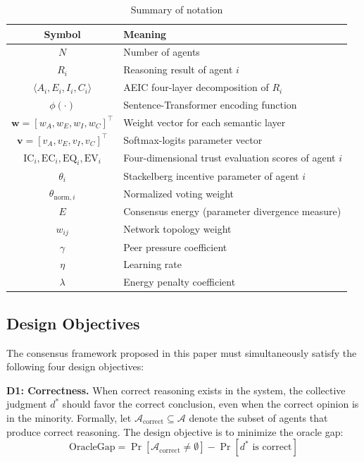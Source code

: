 \documentclass[12pt,a4paper]{article}
\begin{document}
\begin{table}[H]
\centering
\caption{Summary of notation}\label{tab:notation}
\begin{tabular}{cl}
\toprule
Symbol & Meaning \\
\midrule
$N$ & Number of agents \\
$R_i$ & Reasoning result of agent $i$ \\
$\langle A_i, E_i, I_i, C_i \rangle$ & AEIC four-layer decomposition of $R_i$ \\
$\phi(\cdot)$ & Sentence-Transformer encoding function \\
$\mathbf{w} = [w_A, w_E, w_I, w_C]^\top$ & Weight vector for each semantic layer \\
$\mathbf{v} = [v_A, v_E, v_I, v_C]^\top$ & Softmax-logits parameter vector \\
$\text{IC}_i, \text{EC}_i, \text{EQ}_i, \text{EV}_i$ & Four-dimensional trust evaluation scores of agent $i$ \\
$\theta_i$ & Stackelberg incentive parameter of agent $i$ \\
$\theta_{\text{norm},i}$ & Normalized voting weight \\
$E$ & Consensus energy (parameter divergence measure) \\
$w_{ij}$ & Network topology weight \\
$\gamma$ & Peer pressure coefficient \\
$\eta$ & Learning rate \\
$\lambda$ & Energy penalty coefficient \\
\bottomrule
\end{tabular}
\end{table}

\subsection{Design Objectives}

The consensus framework proposed in this paper must simultaneously satisfy the following four design objectives:

\textbf{D1: Correctness.} When correct reasoning exists in the system, the collective judgment $d^*$ should favor the correct conclusion, even when the correct opinion is in the minority. Formally, let $\mathcal{A}_{\text{correct}} \subseteq \mathcal{A}$ denote the subset of agents that produce correct reasoning. The design objective is to minimize the oracle gap:
\begin{equation}
\text{OracleGap} = \Pr[\mathcal{A}_{\text{correct}} \neq \emptyset] - \Pr[d^* \text{ is correct}]
\end{equation}
\end{document}

